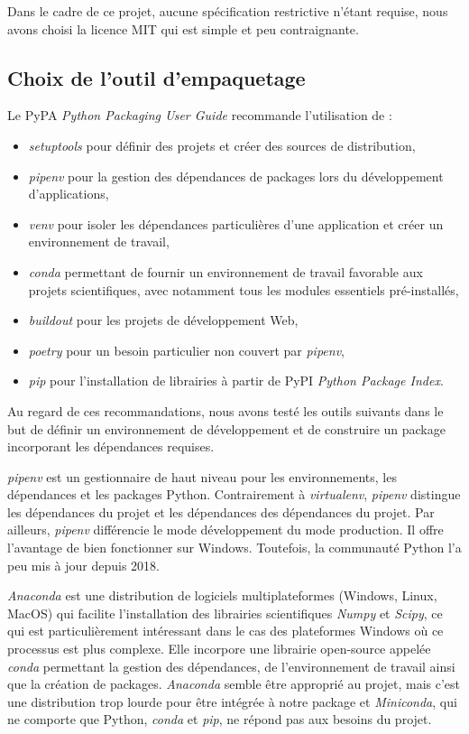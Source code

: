 \documentclass[twoside,a4paper,11pt,frenchb,openany]{report}
\begin{document}
Dans le cadre de ce projet, aucune spécification restrictive n'étant requise, nous avons choisi la licence MIT qui est simple et peu contraignante.

	

\subsection{Choix de l'outil d'empaquetage}
	
	Le PyPA \textit{Python Packaging User Guide} recommande l'utilisation de :
\begin{itemize}
\item \textit{setuptools} pour définir des projets et créer des sources de distribution,
\item \textit{pipenv} pour la gestion des dépendances de packages lors du développement d'applications,
\item \textit{venv} pour isoler les dépendances particulières d'une application et créer un environnement de travail,
\item \textit{conda} permettant de fournir un environnement de travail favorable aux projets scientifiques, avec notamment tous les modules essentiels pré-installés,
\item \textit{buildout} pour les projets de développement Web,
\item \textit{poetry} pour un besoin particulier non couvert par \textit{pipenv},
\item \textit{pip} pour l'installation de librairies à partir de PyPI \textit{Python Package Index}.
\end{itemize}

Au regard de ces recommandations, nous avons testé les outils suivants dans le but de définir un environnement de développement et de construire un package incorporant les dépendances requises.

\textit{pipenv} est un gestionnaire de haut niveau pour les environnements, les dépendances et les packages Python. Contrairement à \textit{virtualenv}, \textit{pipenv} distingue les dépendances du projet et les dépendances des dépendances du projet. Par ailleurs, \textit{pipenv} différencie le mode développement du mode production. Il offre l'avantage de bien fonctionner sur Windows. Toutefois, la communauté Python l'a peu mis à jour depuis 2018.

\textit{Anaconda} est une distribution de logiciels multiplateformes (Windows, Linux, MacOS) qui facilite l'installation des librairies scientifiques \textit{Numpy} et \textit{Scipy}, ce qui est particulièrement intéressant dans le cas des plateformes Windows où ce processus est plus complexe. Elle incorpore une librairie open-source appelée \textit{conda} permettant la gestion des dépendances, de l'environnement de travail ainsi que la création de packages. \textit{Anaconda} semble être approprié au projet, mais c'est une distribution trop lourde pour être intégrée à notre package et \textit{Miniconda}, qui ne comporte que Python, \textit{conda} et \textit{pip}, ne répond pas aux besoins du projet.
\end{document}
